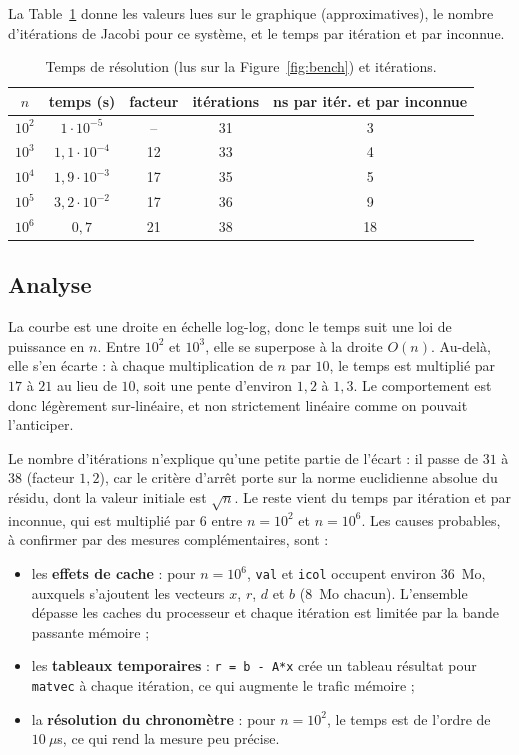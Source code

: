 \documentclass[a4paper]{scrartcl}
\begin{document}
La Table~\ref{tbl:bench} donne les valeurs lues sur le graphique (approximatives), 
le nombre d'itérations de Jacobi pour ce système, et le temps par itération et par inconnue.
\begin{table}[!ht]
\centering
\begin{tabular}{|c|c|c|c|c|}
\hline
$n$ & temps (s) & facteur & itérations & ns par itér. et par inconnue \\ \hline
$10^2$ & $1\cdot10^{-5}$ & -- & 31 & 3 \\ \hline
$10^3$ & $1{,}1\cdot10^{-4}$ & 12 & 33 & 4 \\ \hline
$10^4$ & $1{,}9\cdot10^{-3}$ & 17 & 35 & 5 \\ \hline
$10^5$ & $3{,}2\cdot10^{-2}$ & 17 & 36 & 9 \\ \hline
$10^6$ & $0{,}7$ & 21 & 38 & 18 \\ \hline
\end{tabular}
\caption{Temps de résolution (lus sur la Figure~\ref{fig:bench}) et itérations.}
\label{tbl:bench}
\end{table}

\subsection{Analyse}

La courbe est une droite en échelle log-log, donc le temps suit une loi de puissance en $n$. 
Entre $10^2$ et $10^3$, elle se superpose à la droite $O(n)$. Au-delà, elle s'en écarte : 
à chaque multiplication de $n$ par $10$, le temps est multiplié par $17$ à $21$ au lieu de $10$, 
soit une pente d'environ $1{,}2$ à $1{,}3$. Le comportement est donc légèrement sur-linéaire, 
et non strictement linéaire comme on pouvait l'anticiper.

Le nombre d'itérations n'explique qu'une petite partie de l'écart : il passe de $31$ à $38$ (facteur $1{,}2$), 
car le critère d'arrêt porte sur la norme euclidienne absolue du résidu, dont la valeur initiale est $\sqrt n$. 
Le reste vient du temps par itération et par inconnue, qui est multiplié par $6$ entre $n=10^2$ et $n=10^6$. 
Les causes probables, à confirmer par des mesures complémentaires, sont :
\begin{itemize}
\item les \textbf{effets de cache} : pour $n=10^6$, \lstinline{val} et \lstinline{icol} occupent environ $36$~Mo, auxquels s'ajoutent les vecteurs $x$, $r$, $d$ et $b$ ($8$~Mo chacun). L'ensemble dépasse les caches du processeur et chaque itération est limitée par la bande passante mémoire ;
\item les \textbf{tableaux temporaires} : \lstinline{r = b - A*x} crée un tableau résultat pour \lstinline{matvec} à chaque itération, ce qui augmente le trafic mémoire ;
\item la \textbf{résolution du chronomètre} : pour $n=10^2$, le temps est de l'ordre de $10~\mu$s, ce qui rend la mesure peu précise.
\end{itemize}
\end{document}
